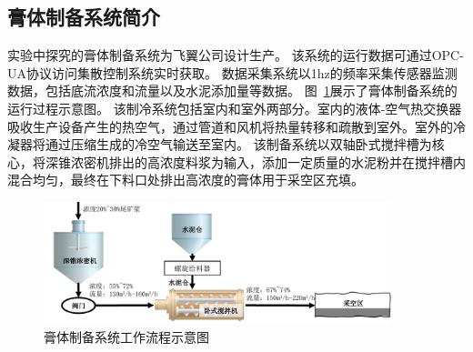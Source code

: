 \subsection{膏体制备系统简介}
\label{sec:ecotype_description}

实验中探究的膏体制备系统为飞翼公司设计生产。
该系统的运行数据可通过OPC-UA协议访问集散控制系统实时获取。
数据采集系统以1hz的频率采集传感器监测数据，包括底流浓度和流量以及水泥添加量等数据。
图~\ref{fig:paste_system}展示了膏体制备系统的运行过程示意图。
该制冷系统包括室内和室外两部分。室内的液体-空气热交换器吸收生产设备产生的热空气，通过管道和风机将热量转移和疏散到室外。室外的冷凝器将通过压缩生成的冷空气输送至室内。
该制备系统以双轴卧式搅拌槽为核心，将深锥浓密机排出的高浓度料浆为输入，添加一定质量的水泥粉并在搅拌槽内混合均匀，最终在下料口处排出高浓度的膏体用于采空区充填。

\begin{figure}[!htbp]
  \centering
  \includegraphics[width=0.9\textwidth]{figures/chapter4/paste_system.pdf}
  \caption{膏体制备系统工作流程示意图}
\label{fig:paste_system} 
\end{figure}

